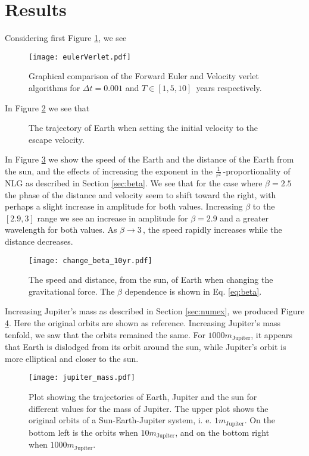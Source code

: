 \section{Results}
\label{sec:results}

Considering first Figure \ref{fig:compare euler verlet}, we see
\begin{figure}[htbp]
	\centering
	\texttt{[image: eulerVerlet.pdf]}
	\caption{Graphical comparison of the Forward Euler and Velocity verlet algorithms for $\Delta t = 0.001$ and $T \in [1, 5, 10]\,$ years respectively.}
	\label{fig:compare euler verlet}
\end{figure}


In Figure \ref{fig:earth escape} we see that
\begin{figure}[htbp]
	\centering
	\caption{The trajectory of Earth when setting the initial velocity to the escape velocity.}
	\label{fig:earth escape}
\end{figure}

In Figure \ref{fig:changing beta} we show the speed of the Earth and the distance of the Earth from the sun, and the effects of increasing the exponent in the $\frac{1}{r^2}\,$-proportionality of NLG as described in Section \ref{sec:beta}. We see that for the case where $\beta=2.5$ the phase of the distance and velocity seem to shift toward the right, with perhaps a slight increase in amplitude for both values. Increasing $\beta$ to the $[2.9, 3]$ range we see an increase in amplitude for $\beta = 2.9$ and a greater wavelength for both values. As $\beta \rightarrow 3\,$, the speed rapidly increases while the distance decreases.
\begin{figure}[htbp]
	\centering
	\texttt{[image: change\_beta\_10yr.pdf]}
	\caption{The speed and distance, from the sun, of Earth when changing the gravitational force. The $\beta$ dependence is shown in Eq. \ref{eq:beta}.}
	\label{fig:changing beta}
\end{figure}

Increasing Jupiter's mass as described in Section \ref{sec:numex}, we produced Figure \ref{fig:jupiter mass}. Here the original orbits are shown as reference. Increasing Jupiter's mass tenfold, we saw that the orbits remained the same.
For $1000m_{\text{Jupiter}}$, it appears that Earth is dislodged from its orbit around the sun, while Jupiter's orbit is more elliptical and closer to the sun.
\begin{figure}[htbp]
	\centering
	\texttt{[image: jupiter\_mass.pdf]}
	\caption{Plot showing the trajectories of Earth, Jupiter and the sun for different values for the mass of Jupiter. The upper plot shows the original orbits of a Sun-Earth-Jupiter system, i. e. $1m_{\text{Jupiter}}$. On the bottom left is the orbits when $10m_{\text{Jupiter}}$, and on the bottom right when $1000m_{\text{Jupiter}}$.}
	\label{fig:jupiter mass}
\end{figure}

